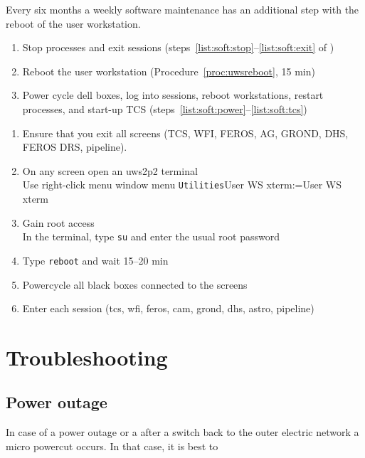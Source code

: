 \documentclass[11pt,fleqn,a4paper]{book}
\makeatletter
\def\menu#1#2{\texttt{#1}\ifx{}#2\else\@for\@x:=#2\do{$\rightarrow$\texttt{\@x}}\fi}
\def\wmenu#1#2{window menu \menu{#1}{#2}}
\makeatother
\begin{document}
Every six months a weekly software maintenance has an additional step with the reboot of the user workstation.

\begin{enumerate}
	\item Stop processes and exit sessions (steps~\ref{list:soft:stop}--\ref{list:soft:exit} of )
	\item Reboot the user workstation (Procedure~\ref{proc:uwsreboot}, 15 min)
	\item Power cycle dell boxes, log into sessions, reboot workstations, restart processes, and start-up TCS (steps~\ref{list:soft:power}--\ref{list:soft:tcs})
\end{enumerate}

\label{proc:uwsreboot}
\begin{enumerate}
	\item Ensure that you exit all screens (TCS, WFI, FEROS, AG, GROND, DHS, FEROS DRS, pipeline).
	\item On any screen open an \gls{uws2p2} terminal\\
	Use right-click menu \wmenu{Utilities}{User WS xterm}
	\item Gain root access\\
	In the terminal, type \texttt{su} and enter the usual root password
	\item Type \texttt{reboot} and wait 15--20 min
	\item Powercycle all black boxes connected to the screens
	\item Enter each session (tcs, wfi, feros, cam, grond, dhs, astro, pipeline)
\end{enumerate}


\chapter{Troubleshooting}
\label{chap:trouble}

\section{Power outage}
\label{sec:power}

In case of a power outage or a after a switch back to the outer electric network a micro powercut occurs.  In that case, it is best to
\end{document}
